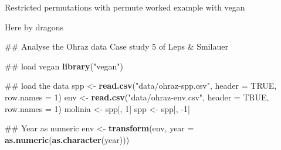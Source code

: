 \documentclass[10pt,ignorenonframetext,compress, aspectratio=169]{beamer}
\newenvironment{Shaded}{\begin{snugshade}}{\end{snugshade}}
\newcommand{\KeywordTok}[1]{\textcolor[rgb]{0.13,0.29,0.53}{\textbf{{#1}}}}
\newcommand{\DataTypeTok}[1]{\textcolor[rgb]{0.13,0.29,0.53}{{#1}}}
\newcommand{\DecValTok}[1]{\textcolor[rgb]{0.00,0.00,0.81}{{#1}}}
\newcommand{\StringTok}[1]{\textcolor[rgb]{0.31,0.60,0.02}{{#1}}}
\newcommand{\OtherTok}[1]{\textcolor[rgb]{0.56,0.35,0.01}{{#1}}}
\newcommand{\NormalTok}[1]{{#1}}
\begin{document}
\begin{frame}[fragile]{Restricted permutations with permute \textbar{}
worked example with vegan}

Here by dragons

\scriptsize

\begin{Shaded}
\begin{Highlighting}[]
\NormalTok{## Analyse the Ohraz data Case study 5 of Leps & Smilauer}

\NormalTok{## load vegan}
\KeywordTok{library}\NormalTok{(}\StringTok{"vegan"}\NormalTok{)}

\NormalTok{## load the data}
\NormalTok{spp <-}\StringTok{ }\KeywordTok{read.csv}\NormalTok{(}\StringTok{"data/ohraz-spp.csv"}\NormalTok{, }\DataTypeTok{header =} \OtherTok{TRUE}\NormalTok{, }\DataTypeTok{row.names =} \DecValTok{1}\NormalTok{)}
\NormalTok{env <-}\StringTok{ }\KeywordTok{read.csv}\NormalTok{(}\StringTok{"data/ohraz-env.csv"}\NormalTok{, }\DataTypeTok{header =} \OtherTok{TRUE}\NormalTok{, }\DataTypeTok{row.names =} \DecValTok{1}\NormalTok{)}
\NormalTok{molinia <-}\StringTok{ }\NormalTok{spp[, }\DecValTok{1}\NormalTok{]}
\NormalTok{spp <-}\StringTok{ }\NormalTok{spp[, -}\DecValTok{1}\NormalTok{]}

\NormalTok{## Year as numeric}
\NormalTok{env <-}\StringTok{ }\KeywordTok{transform}\NormalTok{(env, }\DataTypeTok{year =} \KeywordTok{as.numeric}\NormalTok{(}\KeywordTok{as.character}\NormalTok{(year)))}
\end{Highlighting}
\end{Shaded}

\normalsize

\end{frame}
\end{document}
